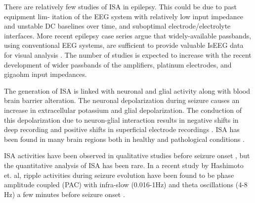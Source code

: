There are relatively few studies of ISA in epilepsy. This could be due to past equipment lim- itation of the EEG system with relatively low input impedance and unstable DC baselines over time, and suboptimal electrode/electrolyte interfaces. More recent epilepsy case series argue that widely-available passbands, using conventional EEG systems, are sufficient to provide valuable IsEEG data for visual analysis \citep{rampp2012ictal}. The number of studies is expected to increase with the recent development of wider passbands of the amplifiers, platinum electrodes, and gigaohm input impedances.

The generation of ISA is linked with neuronal and glial activity along with blood brain barrier alteration. The neuronal depolarization during seizure causes an increase in extracellular potassium and glial depolarization. The conduction of this depolarization due to neuron-glial interaction results in negative shifts in deep recording and positive shifts in superficial electrode recordings \citep{shorvon2015treatment}. ISA has been found in many brain regions both in healthy \citep{mitra2015propagated} and pathological conditions \citep{hughes2011infraslow}. 

ISA activities have been observed in qualitative studies before seizure onset \citep{modur2012seizure}, but the quantitative analysis of ISA has been rare. In a recent study by Hashimoto et. al, ripple activities during seizure evolution have been found to be phase amplitude coupled (PAC) with infra-slow (0.016-1Hz) \citep{hashimoto2020coupling} and theta oscillations (4-8 Hz) a few minutes before seizure onset \citep{hashimoto2021phase}. 





